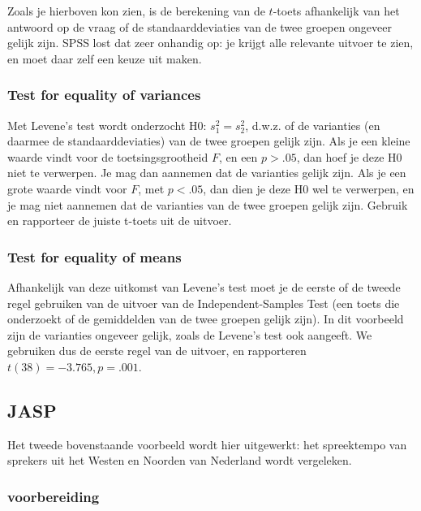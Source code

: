 \documentclass[
]{book}
\begin{document}
Zoals je hierboven kon zien, is de berekening van de \(t\)-toets afhankelijk van het
antwoord op de vraag of de standaarddeviaties van de twee groepen
ongeveer gelijk zijn. SPSS lost dat zeer onhandig op: je krijgt alle
relevante uitvoer te zien, en moet daar zelf een keuze uit maken.

\hypertarget{test-for-equality-of-variances}{%
\subsubsection{Test for equality of variances}\label{test-for-equality-of-variances}}

Met Levene's test wordt onderzocht H0: \(s^2_1 = s^2_2\), d.w.z. of de
varianties (en daarmee de standaarddeviaties) van de twee groepen gelijk
zijn. Als je een kleine waarde vindt voor de toetsingsgrootheid \(F\), en
een \(p>.05\), dan hoef je deze H0 niet te verwerpen. Je mag dan aannemen
dat de varianties gelijk zijn. Als je een grote waarde vindt voor \(F\),
met \(p<.05\), dan dien je deze H0 wel te verwerpen, en je mag niet
aannemen dat de varianties van de twee groepen gelijk zijn.
Gebruik en rapporteer de juiste t-toets uit de uitvoer.

\hypertarget{test-for-equality-of-means}{%
\subsubsection{Test for equality of means}\label{test-for-equality-of-means}}

Afhankelijk van deze uitkomst van Levene's test moet je de eerste of de
tweede regel gebruiken van de uitvoer van de Independent-Samples Test
(een toets die onderzoekt of de gemiddelden van de twee groepen gelijk
zijn). In dit voorbeeld zijn de varianties ongeveer gelijk, zoals de
Levene's test ook aangeeft. We gebruiken dus de eerste regel van de
uitvoer, en rapporteren \(t(38)=-3.765, p=.001\).

\hypertarget{sec:jaspttoetsongepaard}{%
\subsection{JASP}\label{sec:jaspttoetsongepaard}}

Het tweede bovenstaande voorbeeld wordt hier uitgewerkt: het spreektempo van sprekers uit het Westen en Noorden van Nederland wordt vergeleken.

\hypertarget{voorbereiding}{%
\subsubsection{voorbereiding}\label{voorbereiding}}
\end{document}

